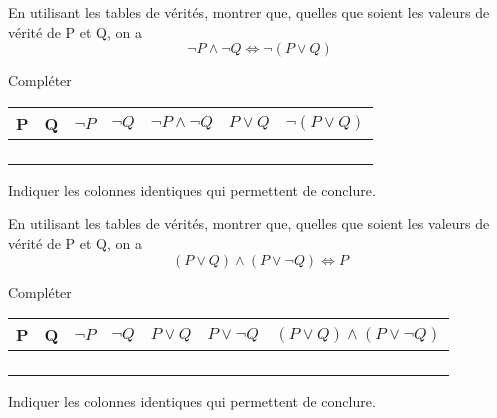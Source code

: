 \documentclass[a4paper,12pt]{article}
\begin{document}

\exo{}

En utilisant les tables de vérités, montrer que, quelles que soient les valeurs de vérité de P et Q, on a $$\neg P \wedge \neg Q \Leftrightarrow \neg(P\vee Q)$$

Compléter

\begin{center}
	
	\begin{tabular}{|c|c|c|c|c|c|c|}
		\hline 
		P & Q & $\neg P$ & $\neg Q$ & $\neg P \wedge \neg Q$  & $P\vee Q$ & $\neg(P\vee Q)$ \\ 
		\hline 
		&  &  &  &  &  &\\ 
		\hline 
&		&  &  &  &  &  \\ 
		\hline 
&		&  &  &  &  &  \\ 
		\hline 
&		&  &  &  &  &  \\ 
		\hline 
	\end{tabular} 
\end{center}
Indiquer les colonnes identiques qui permettent de conclure.\\

\exo{}

En utilisant les tables de vérités, montrer que, quelles que soient les valeurs de vérité de P et Q, on a $$(P\vee Q)\wedge (P\vee \neg Q)\Leftrightarrow P$$

Compléter

\begin{center}
	
	\begin{tabular}{|c|c|c|c|c|c|c|}
		\hline 
		P & Q & $\neg P$ & $\neg Q$ & $P \vee Q$  & $P\vee \neg Q$ & $(P\vee Q)\wedge (P\vee \neg Q)$\\ 
		\hline 
		&  &  &  &  &  &\\ 
		\hline 
		&  &  &  &  &  &\\ 
		\hline 
		&  &  &  &  &  &\\ 
		\hline 
		&  &  &  & 	&  &  \\ 
		\hline 
	\end{tabular} 
\end{center}
Indiquer les colonnes identiques qui permettent de conclure.
\end{document}
